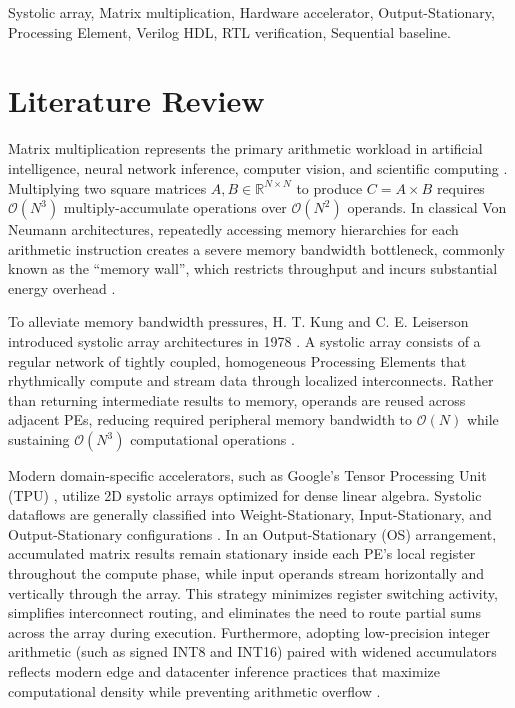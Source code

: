 \documentclass[conference]{IEEEtran}
\begin{document}
\begin{IEEEkeywords}
Systolic array, Matrix multiplication, Hardware accelerator, Output-Stationary, Processing Element, Verilog HDL, RTL verification, Sequential baseline.
\end{IEEEkeywords}

\section{Literature Review}
Matrix multiplication represents the primary arithmetic workload in artificial intelligence, neural network inference, computer vision, and scientific computing \cite{jouppi2017}. Multiplying two square matrices $A, B \in \mathbb{R}^{N \times N}$ to produce $C = A \times B$ requires $\mathcal{O}(N^3)$ multiply-accumulate operations over $\mathcal{O}(N^2)$ operands. In classical Von Neumann architectures, repeatedly accessing memory hierarchies for each arithmetic instruction creates a severe memory bandwidth bottleneck, commonly known as the ``memory wall'', which restricts throughput and incurs substantial energy overhead \cite{patterson2020}.

To alleviate memory bandwidth pressures, H. T. Kung and C. E. Leiserson introduced systolic array architectures in 1978 \cite{kung1978}. A systolic array consists of a regular network of tightly coupled, homogeneous Processing Elements that rhythmically compute and stream data through localized interconnects. Rather than returning intermediate results to memory, operands are reused across adjacent PEs, reducing required peripheral memory bandwidth to $\mathcal{O}(N)$ while sustaining $\mathcal{O}(N^3)$ computational operations \cite{kung1978}.

Modern domain-specific accelerators, such as Google's Tensor Processing Unit (TPU) \cite{jouppi2017}, utilize 2D systolic arrays optimized for dense linear algebra. Systolic dataflows are generally classified into Weight-Stationary, Input-Stationary, and Output-Stationary configurations \cite{jouppi2017}. In an Output-Stationary (OS) arrangement, accumulated matrix results remain stationary inside each PE's local register throughout the compute phase, while input operands stream horizontally and vertically through the array. This strategy minimizes register switching activity, simplifies interconnect routing, and eliminates the need to route partial sums across the array during execution. Furthermore, adopting low-precision integer arithmetic (such as signed INT8 and INT16) paired with widened accumulators reflects modern edge and datacenter inference practices that maximize computational density while preventing arithmetic overflow \cite{patterson2020}.
\end{document}
